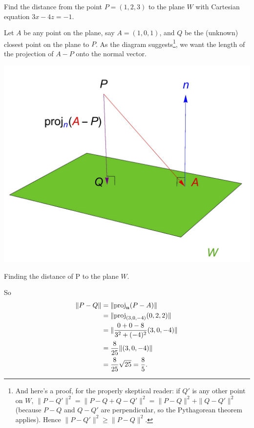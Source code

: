 \begin{myprob} 
Find the distance from the point $P = (1,2,3)$
to the plane $W$ with Cartesian equation $3x-4z=-1$.

\begin{mysol} 



Let $A$ be any point on the plane, say $A=(1,0,1)$, and $Q$ be the (unknown) closest point on the plane to $P$.
As the diagram suggests\footnote{And here's a proof, for the properly skeptical reader: if $Q'$ is any other point on $W$, $\|P-Q'\|^2=\|P-Q+ Q-Q'\|^2= \|P-Q\|^2+ \|Q-Q'\|^2$ (because $P-Q$ and $Q-Q'$ are perpendicular, so the Pythagorean theorem applies). Hence $\|P-Q'\|^2\ge  \|P-Q\|^2$. }, we want the length of the projection of $A-P$ onto the normal vector.

\begin{center}


\includegraphics[scale=.5] {img/projP_on_W.jpg}

{Finding the distance of P to the plane $W$.} 
\end{center}


So
\begin{align*}
\Vert P-Q \Vert &= \Vert {\operatorname{proj}}_{\mathbf{n}}(P-A) \Vert\\
&= \Vert {\operatorname{proj}}_{(3,0,-4)}(0,2,2) \Vert\\
&= \Vert \frac{0+0-8}{3^2+(-4)^2}(3,0,-4) \Vert\\
&= \frac{8}{25} \Vert (3,0,-4) \Vert\\
&= \frac{8}{25} \sqrt{25} = \frac{8}{5}.
\end{align*}
\end{mysol}
\end{myprob}

